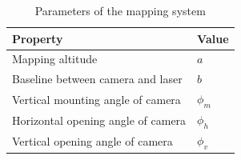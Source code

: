\begin{table}[!ht]
\centering
\caption{Parameters of the mapping system}
\begin{tabular}{  |p{6cm}  p{4cm}| }
\hline
\textbf{Property} & \textbf{Value}\\ \hline 
Mapping altitude & $a$\\
Baseline between camera and laser & $b$\\
Vertical mounting angle of camera & $\phi_m$\\
Horizontal opening angle of camera & $\phi_h$\\
Vertical opening angle of camera & $\phi_v$\\
\hline
\end{tabular}
\label{t:table0}
\end{table}

 